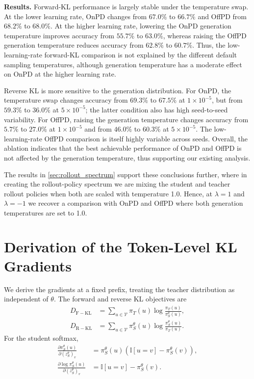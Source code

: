 \documentclass{article} %
\theoremstyle{plain}
\theoremstyle{definition}
\theoremstyle{remark}
\begin{document}
\textbf{Results.} Forward-KL performance is largely stable under the temperature swap. At the lower learning rate, OnPD changes from $67.0\%$ to $66.7\%$ and OffPD from
$68.2\%$ to $68.0\%$. At the higher learning rate, lowering the OnPD generation
temperature improves accuracy from $55.7\%$ to $63.0\%$, whereas raising the
OffPD generation temperature reduces accuracy from $62.8\%$ to $60.7\%$.
Thus, the low-learning-rate forward-KL comparison is not explained by the
different default sampling temperatures, although generation temperature has a
moderate effect on OnPD at the higher learning rate. 

Reverse KL is more sensitive to the generation distribution. For OnPD, the
temperature swap changes accuracy from $69.3\%$ to $67.5\%$ at
$1\times10^{-5}$, but from $59.3\%$ to $36.0\%$ at $5\times10^{-5}$; the latter
condition also has high seed-to-seed variability. For OffPD, raising the
generation temperature changes accuracy from $5.7\%$ to $27.0\%$ at
$1\times10^{-5}$ and from $46.0\%$ to $60.3\%$ at $5\times10^{-5}$. The
low-learning-rate OffPD comparison is itself highly variable across seeds.
Overall, the ablation indicates that the best achievable performance of OnPD and OffPD is not affected by the generation temperature, thus supporting our existing analysis.

The results in \cref{sec:rollout_spectrum} support these conclusions further, where in creating the rollout-policy spectrum we are mixing the student and teacher rollout policies when both are scaled with temperature 1.0. Hence, at $\lambda=1$ and $\lambda=-1$ we recover a comparison with OnPD and OffPD where both generation temperatures are set to 1.0.



\clearpage
\section{Derivation of the Token-Level KL Gradients}
\label{app:kl-gradients}

We derive the gradients at a fixed prefix, treating the teacher distribution as independent of \(\theta\). The forward and reverse KL objectives are
\begin{align}
D_{\mathrm{F-KL}}
&=
\sum_{u\in\mathcal{V}}
\pi_T(u)
\log\frac{\pi_T(u)}{\pi_S^\theta(u)},
\\
D_{\mathrm{R-KL}}
&=
\sum_{u\in\mathcal{V}}
\pi_S^\theta(u)
\log\frac{\pi_S^\theta(u)}{\pi_T(u)}.
\end{align}
For the student softmax,
\begin{align}
\frac{\partial \pi_S^\theta(u)}
{\partial (z_S^\theta)_v}
&=
\pi_S^\theta(u)
\left(
\mathbb{I}[u=v]-\pi_S^\theta(v)
\right),
\\
\frac{\partial\log\pi_S^\theta(u)}
{\partial (z_S^\theta)_v}
&=
\mathbb{I}[u=v]-\pi_S^\theta(v).
\end{align}
\end{document}
